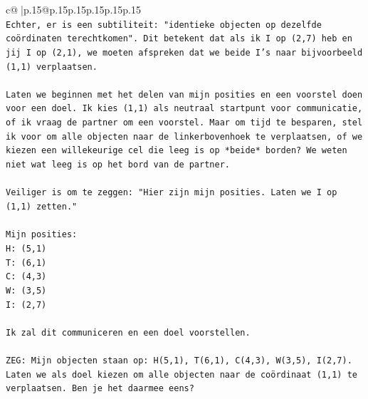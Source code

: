 \documentclass{article}
\begin{document}
{\begin{supertabular}{c@{$\;$}|p{.15\linewidth}@{}p{.15\linewidth}p{.15\linewidth}p{.15\linewidth}p{.15\linewidth}p{.15\linewidth}}
{{{\\ 
\texttt{Echter, er is een subtiliteit: "identieke objecten op dezelfde coördinaten terechtkomen". Dit betekent dat als ik I op (2,7) heb en jij I op (2,1), we moeten afspreken dat we beide I's naar bijvoorbeeld (1,1) verplaatsen.} \\
\\ 
\texttt{Laten we beginnen met het delen van mijn posities en een voorstel doen voor een doel. Ik kies (1,1) als neutraal startpunt voor communicatie, of ik vraag de partner om een voorstel. Maar om tijd te besparen, stel ik voor om alle objecten naar de linkerbovenhoek te verplaatsen, of we kiezen een willekeurige cel die leeg is op *beide* borden? We weten niet wat leeg is op het bord van de partner.} \\
\\ 
\texttt{Veiliger is om te zeggen: "Hier zijn mijn posities. Laten we I op (1,1) zetten."} \\
\\ 
\texttt{Mijn posities:} \\
\texttt{H: (5,1)} \\
\texttt{T: (6,1)} \\
\texttt{C: (4,3)} \\
\texttt{W: (3,5)} \\
\texttt{I: (2,7)} \\
\\ 
\texttt{Ik zal dit communiceren en een doel voorstellen.} \\
\\ 
\texttt{ZEG: Mijn objecten staan op: H(5,1), T(6,1), C(4,3), W(3,5), I(2,7). Laten we als doel kiezen om alle objecten naar de coördinaat (1,1) te verplaatsen. Ben je het daarmee eens?} \\
            }
        }
    }
     \\ \\


\end{supertabular}}
\end{document}
